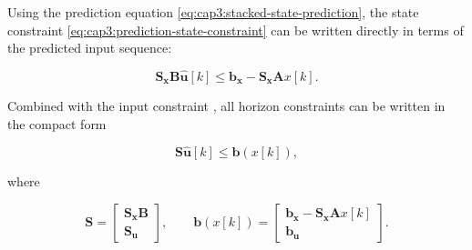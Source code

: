 Using the prediction equation \eqref{eq:cap3:stacked-state-prediction}, the state constraint \eqref{eq:cap3:prediction-state-constraint} can be written directly in terms of the predicted input sequence:

\noindent
\begin{equation}
	\mathbf{S_x} \mathbf{B} \mathbf{\hat{u}}[k] \le \mathbf{b_x} - \mathbf{S_x} \mathbf{A} x[k].
\end{equation}

\noindent
Combined with the input constraint , all horizon constraints can be written in the compact form

\noindent
\begin{equation}
	\label{eq:cap3:optimization-constraints}
	\mathbf{S} \mathbf{\hat{u}}[k] \le \mathbf{b}(x[k]),
\end{equation}

\noindent
where

\noindent
\begin{equation}
	\mathbf{S} =
	\left[
		\begin{matrix}
			\mathbf{S_x} \mathbf{B} \\
			\mathbf{S_u}
		\end{matrix}
	\right],
	\qquad
	\mathbf{b}(x[k]) =
	\left[
		\begin{matrix}
			\mathbf{b_x} - \mathbf{S_x} \mathbf{A} x[k] \\
			\mathbf{b_u}
		\end{matrix}
	\right].
\end{equation}
